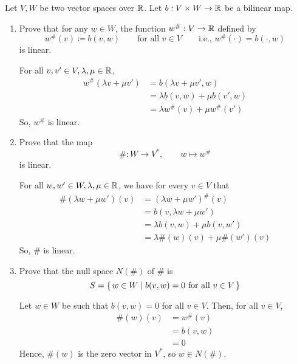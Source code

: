 \documentclass{article}
\begin{document}
\begin{problem}
Let $V, W$ be two vector spaces over $\mathbb{R}$.
Let $b : V \times W \to \mathbb{R}$ be a bilinear map.
\begin{enumerate}[label=(\alph*)]
	\item Prove that for any $w \in W$, the function $w^{\#} : V \to \mathbb{R}$ defined by
	      \[
		      w^{\#}(v) \coloneq b(v, w) \qquad \text{for all $v \in V$} \qquad \text{i.e., $w^{\#}(\cdot) = b(\cdot, w)$}
	      \]
	      is linear.
	      \begin{solution}
		      For all $v, v' \in V, \lambda, \mu \in \mathbb{R}$,
		      \begin{align*}
			      w^{\#}(\lambda v + \mu v') & = b(\lambda v + \mu v', w)                             \\
			                                 & = \lambda b(v, w) + \mu b(v', w) \tag{$b$ is bilinear} \\
			                                 & = \lambda w^{\#}(v) + \mu w^{\#}(v')
		      \end{align*}
		      So, $w^{\#}$ is linear.
	      \end{solution}

	\item Prove that the map
	      \[
		      \# : W \to V^*, \qquad w \mapsto w^{\#}
	      \]
	      is linear.
	      \begin{solution}
		      For all $w, w' \in W, \lambda, \mu \in \mathbb{R}$, we have for every $v \in V$ that
		      \begin{align*}
			      \#(\lambda w + \mu w')(v) & = (\lambda w + \mu w')^{\#}(v)                         \\
			                                & = b(v, \lambda w + \mu w')                             \\
			                                & = \lambda b(v, w) + \mu b(v, w') \tag{$b$ is bilinear} \\
			                                & = \lambda \#(w)(v) + \mu \#(w')(v)
		      \end{align*}
		      So, $\#$ is linear.
	      \end{solution}

	\item Prove that the null space $N(\#)$ of $\#$ is
	      \[
		      S = \set{w \in W \mid b(v, w) = 0 \text{ for all $v \in V$}}
	      \]
	      \begin{solution}
		      Let $w \in W$ be such that $b(v, w) = 0$ for all $v \in V$.
		      Then, for all $v \in V$,
		      \begin{align*}
			      \#(w)(v) & = w^{\#}(v) \\
			               & = b(v, w)   \\
			               & = 0
		      \end{align*}
		      Hence, $\#(w)$ is the zero vector in $V^*$, so $w \in N(\#)$.


\end{solution}
\end{enumerate}
\end{problem}
\end{document}

